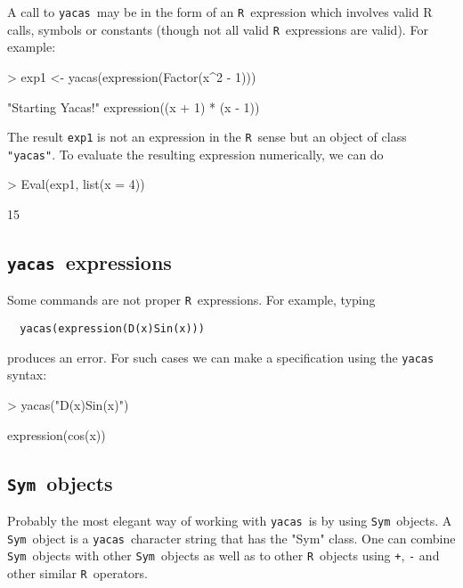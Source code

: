 \documentclass[]{article}
\newcommand{\yacas}{{\tt yacas}}
\newcommand{\code}[1]{{\tt #1}}
\def\R{\texttt{R}}
\def\sym{\texttt{Sym}}
\begin{document}
A call to \yacas\ may be in the form of an \R\ expression which
involves valid R calls, symbols or constants (though not all valid \R\
expressions are valid). For example:
\begin{Schunk}
\begin{Sinput}
> exp1 <- yacas(expression(Factor(x^2 - 1)))
\end{Sinput}
\begin{Soutput}
[1] "Starting Yacas!"
expression((x + 1) * (x - 1))
\end{Soutput}
\end{Schunk}

The result \code{exp1} is not an expression in the \R\ sense but an
object of class \code{"yacas"}. 
To evaluate the resulting expression numerically, we can do
\begin{Schunk}
\begin{Sinput}
> Eval(exp1, list(x = 4))
\end{Sinput}
\begin{Soutput}
[1] 15
\end{Soutput}
\end{Schunk}

\subsection{\yacas\ expressions}

Some commands are not proper \R\ expressions. For example, 
typing 
\begin{verbatim}
  yacas(expression(D(x)Sin(x)))
\end{verbatim}
produces an error. 
For such cases we can make
a specification using the \yacas{} syntax:
\begin{Schunk}
\begin{Sinput}
> yacas("D(x)Sin(x)")
\end{Sinput}
\begin{Soutput}
expression(cos(x))
\end{Soutput}
\end{Schunk}


\subsection{\sym\ objects}

Probably the most elegant way of working with \yacas\ is by using
\sym\ objects.
A \sym\ object is a \yacas\ character string that has the "Sym" class.
One can combine \sym\ objects with other \sym\ objects as well as to
other \R\ objects using \code{+}, \code{-} and other similar \R\
operators.
\end{document}
